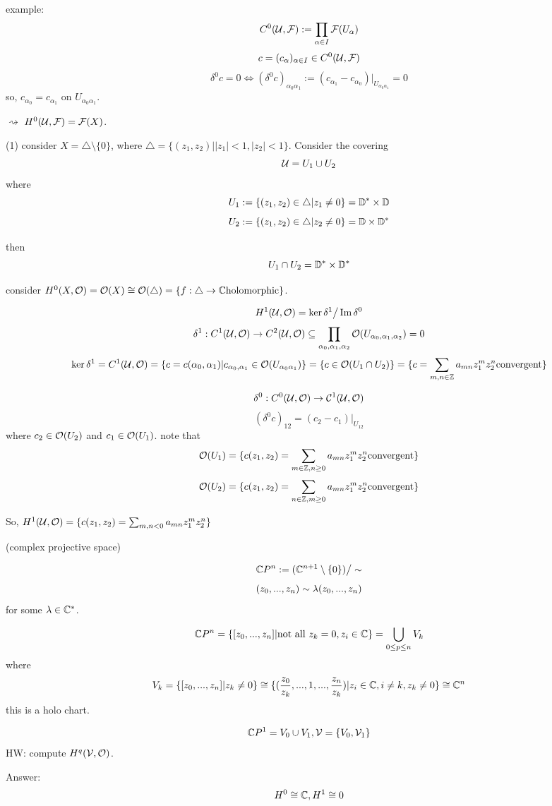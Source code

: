 example:
$$C^0(\mathcal{U},\mathcal{F}):=\prod_{\alpha\in I}\mathcal{F}(U_{\alpha})$$
$$c=(c_{\alpha})_{\alpha\in I}\in C^0(\mathcal{U},\mathcal{F})$$
$$\delta^0c=0\iff(\delta^0c)_{\alpha_0\alpha_1}
:=(c_{\alpha_1}-c_{\alpha_0})|_{U_{\alpha_0\alpha_1}}=0$$
so, $c_{\alpha_0}=c_{\alpha_1}$ on $U_{\alpha_0\alpha_1}$.

$\rightsquigarrow$ $H^0(\mathcal{U},\mathcal{F})=\mathcal{F}(X)$.

\begin{example}
(1) consider $X=\triangle\setminus\{0\}$, where $\triangle=
\{(z_1,z_2)||z_1|<1,|z_2|<1\}$. Consider the covering
$$\mathcal{U}=U_1\cup U_2$$
where
$$U_1:=\{(z_1,z_2)\in\triangle|z_1\neq 0\}=\mathbb{D}^*\times\mathbb{D}$$
$$U_2:=\{(z_1,z_2)\in\triangle|z_2\neq 0\}=\mathbb{D}\times\mathbb{D}^*$$

then
$$U_1\cap U_2=\mathbb{D}^*\times\mathbb{D}^*$$

consider $H^0(X,\mathcal{O})=\mathcal{O}(X)\cong\mathcal{O}(\triangle)
=\{f:\triangle\to\mathbb{C}\text{holomorphic}\}$.

$$H^1(\mathcal{U},\mathcal{O})=\ker\delta^1\big/\operatorname{Im}\delta^0$$
$$\delta^1:C^1(\mathcal{U},\mathcal{O})\to C^2(\mathcal{U},\mathcal{O})\subseteq
\prod_{\alpha_0,\alpha_1,\alpha_2}\mathcal{O}(U_{\alpha_0,\alpha_1,\alpha_2})=0$$
$$\ker\delta^1=
C^1(\mathcal{U},\mathcal{O})=\{c=c(\alpha_0,\alpha_1)|c_{\alpha_0,\alpha_1}\in\mathcal{O}(U_{\alpha_0\alpha_1})\}
=\{c\in\mathcal{O}(U_1\cap U_2)\}=\{c=\sum_{m,n\in\mathbb{Z}}a_{mn}z_1^mz_2^n\text{convergent}\}$$

$$\delta^0:C^0(\mathcal{U},\mathcal{O})\to\mathcal{C}^1(\mathcal{U},\mathcal{O})$$
$$(\delta^0c)_{12}=(c_2-c_1)|_{U_{12}}$$
where $c_2\in\mathcal{O}(U_2)$ and $c_1\in\mathcal{O}(U_1)$.
note that
$$\mathcal{O}(U_1)=\{c(z_1,z_2)=\sum_{m\in\mathbb{Z},n\geq 0}a_{mn}z_1^mz_2^n\text{convergent}\}$$
$$\mathcal{O}(U_2)=\{c(z_1,z_2)=\sum_{n\in\mathbb{Z},m\geq 0}a_{mn}z_1^mz_2^n\text{convergent}\}$$

So, $H^1(\mathcal{U},\mathcal{O})=
\{c(z_1,z_2)=\sum_{m,n<0}a_{mn}z_1^mz_2^n\}$
\end{example}

\begin{example}(complex projective space)

$$\mathbb{C} P^n:=(\mathbb{C}^{n+1}\setminus\{0\})\big/\sim$$
$$(z_0,...,z_n)\sim\lambda(z_0,...,z_n)$$
for some $\lambda\in\mathbb{C}^*$.

$$\mathbb{C} P^n=\{[z_0,...,z_n]|\text{not all $z_k=0$},z_i\in\mathbb{C}\}
=\bigcup_{0\leq p\leq n}V_k$$
where
$$V_k=\{[z_0,...,z_n]|z_k\neq 0\}
\cong \{(\frac{z_0}{z_k},...,1,...,\frac{z_n}{z_k})|
z_i\in\mathbb{C},i\neq k, z_k\neq 0\}\cong \mathbb{C}^n$$
this is a holo chart.

$$\mathbb{C} P^1=V_0\cup V_1,\mathcal{V}=\{V_0,\mathcal{V}_1\}$$
HW: compute $H^q(\mathcal{V},\mathcal{O})$.

Answer:
$$H^0\cong\mathbb{C},H^1\cong 0$$
\end{example}


